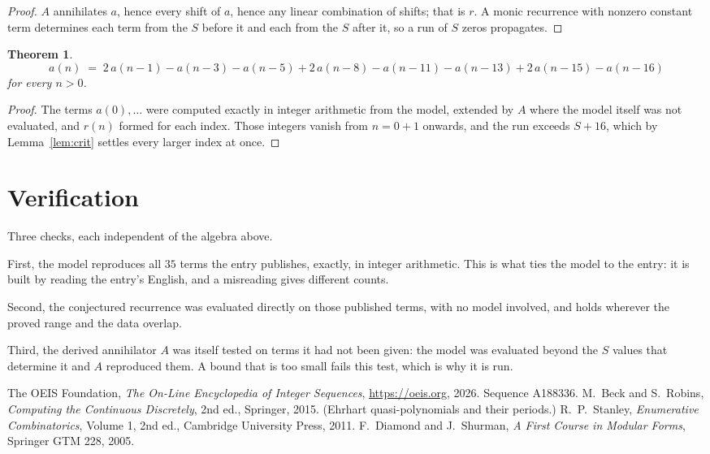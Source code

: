 \documentclass[11pt,a4paper]{article}
\theoremstyle{plain}
\newtheorem{theorem}{Theorem}
\theoremstyle{definition}
\begin{document}
\begin{proof}
$A$ annihilates $a$, hence every shift of $a$, hence any linear combination of shifts; that is
$r$. A monic recurrence with nonzero constant term determines each term from the $S$ before it
and each from the $S$ after it, so a run of $S$ zeros propagates.
\end{proof}

\begin{theorem}
\[
a(n)\;=\;2\,a(n-1) - a(n-3) - a(n-5) + 2\,a(n-8) - a(n-11) - a(n-13) + 2\,a(n-15) - a(n-16)
\]
for every $n>0$.
\end{theorem}

\begin{proof}
The terms $a(0),\dots$ were computed exactly in integer arithmetic from the model, extended by
$A$ where the model itself was not evaluated, and $r(n)$ formed for each index. Those integers
vanish from $n=0+1$ onwards, and the run exceeds $S+16$, which by
Lemma~\ref{lem:crit} settles every larger index at once.
\end{proof}

\section{Verification}

Three checks, each independent of the algebra above.

First, the model reproduces all $35$ terms the entry publishes, exactly, in integer
arithmetic. This is what ties the model to the entry: it is built by reading the entry's
English, and a misreading gives different counts.

Second, the conjectured recurrence was evaluated directly on those published terms, with no
model involved, and holds wherever the proved range and the data overlap.

Third, the derived annihilator $A$ was itself tested on terms it had not been given: the model
was evaluated beyond the $S$ values that determine it and $A$ reproduced them. A bound that is
too small fails this test, which is why it is run.

\begin{thebibliography}{9}
 The OEIS Foundation, \emph{The On-Line Encyclopedia of Integer
Sequences}, \url{https://oeis.org}, 2026. Sequence A188336.
 M.~Beck and S.~Robins, \emph{Computing the Continuous Discretely},
2nd ed., Springer, 2015. (Ehrhart quasi-polynomials and their periods.)
 R.~P.~Stanley, \emph{Enumerative Combinatorics}, Volume 1, 2nd ed.,
Cambridge University Press, 2011.
 F.~Diamond and J.~Shurman, \emph{A First Course in Modular Forms},
Springer GTM 228, 2005.
\end{thebibliography}
\end{document}
